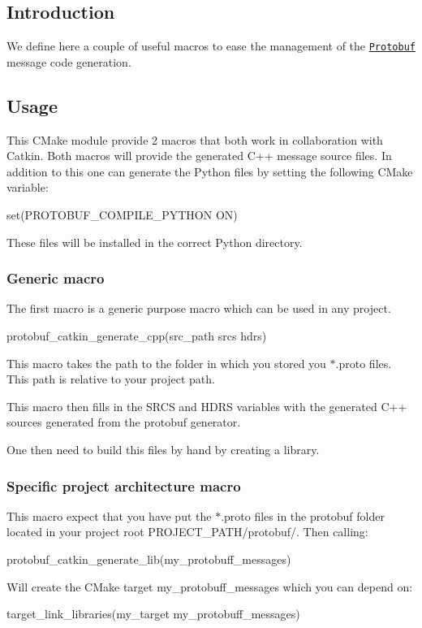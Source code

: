 \subsection*{Introduction}

We define here a couple of useful macros to ease the management of the \href{https://developers.google.com/protocol-buffers/}{\tt Protobuf} message code generation.

\subsection*{Usage}

This C\+Make module provide 2 macros that both work in collaboration with Catkin. Both macros will provide the generated C++ message source files. In addition to this one can generate the Python files by setting the following C\+Make variable\+: \begin{DoxyVerb}set(PROTOBUF_COMPILE_PYTHON ON)
\end{DoxyVerb}


These files will be installed in the correct Python directory.

\subsubsection*{Generic macro}

The first macro is a generic purpose macro which can be used in any project. \begin{DoxyVerb}protobuf_catkin_generate_cpp(src_path srcs hdrs)
\end{DoxyVerb}


This macro takes the path to the folder in which you stored you {\ttfamily $\ast$.proto} files. This path is relative to your project path.

This macro then fills in the {\ttfamily S\+R\+CS} and {\ttfamily H\+D\+RS} variables with the generated C++ sources generated from the protobuf generator.

One then need to build this files by hand by creating a library.

\subsubsection*{Specific project architecture macro}

This macro expect that you have put the {\ttfamily $\ast$.proto} files in the {\ttfamily protobuf} folder located in your project root {\ttfamily P\+R\+O\+J\+E\+C\+T\+\_\+\+P\+A\+T\+H/protobuf/}. Then calling\+: \begin{DoxyVerb}protobuf_catkin_generate_lib(my_protobuff_messages)
\end{DoxyVerb}


Will create the C\+Make target {\ttfamily my\+\_\+protobuff\+\_\+messages} which you can depend on\+: \begin{DoxyVerb}target_link_libraries(my_target my_protobuff_messages)\end{DoxyVerb}
 